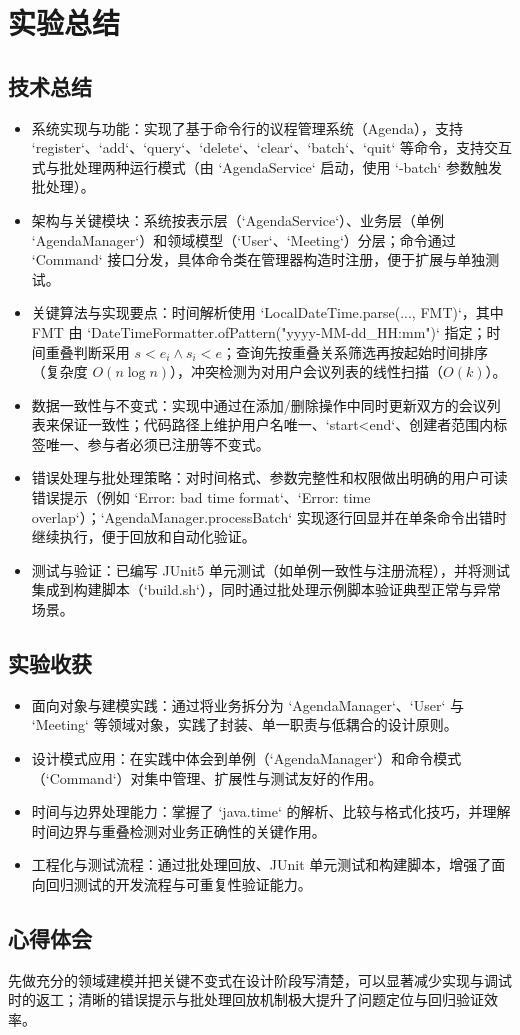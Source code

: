\chapter{实验总结}

\section{技术总结}
\begin{itemize}
  \item 系统实现与功能：实现了基于命令行的议程管理系统（Agenda），支持 `register`、`add`、`query`、`delete`、`clear`、`batch`、`quit` 等命令，支持交互式与批处理两种运行模式（由 `AgendaService` 启动，使用 `-batch` 参数触发批处理）。
  \item 架构与关键模块：系统按表示层（`AgendaService`）、业务层（单例 `AgendaManager`）和领域模型（`User`、`Meeting`）分层；命令通过 `Command` 接口分发，具体命令类在管理器构造时注册，便于扩展与单独测试。
  \item 关键算法与实现要点：时间解析使用 `LocalDateTime.parse(..., FMT)`，其中 FMT 由 `DateTimeFormatter.ofPattern("yyyy-MM-dd\_HH:mm")` 指定；时间重叠判断采用 $s<e_i\land s_i<e$；查询先按重叠关系筛选再按起始时间排序（复杂度 $O(n\log n)$），冲突检测为对用户会议列表的线性扫描（$O(k)$）。
  \item 数据一致性与不变式：实现中通过在添加/删除操作中同时更新双方的会议列表来保证一致性；代码路径上维护用户名唯一、`start<end`、创建者范围内标签唯一、参与者必须已注册等不变式。
  \item 错误处理与批处理策略：对时间格式、参数完整性和权限做出明确的用户可读错误提示（例如 `Error: bad time format`、`Error: time overlap`）；`AgendaManager.processBatch` 实现逐行回显并在单条命令出错时继续执行，便于回放和自动化验证。
  \item 测试与验证：已编写 JUnit5 单元测试（如单例一致性与注册流程），并将测试集成到构建脚本（`build.sh`），同时通过批处理示例脚本验证典型正常与异常场景。
\end{itemize}

\section{实验收获}
\begin{itemize}
  \item 面向对象与建模实践：通过将业务拆分为 `AgendaManager`、`User` 与 `Meeting` 等领域对象，实践了封装、单一职责与低耦合的设计原则。
  \item 设计模式应用：在实践中体会到单例（`AgendaManager`）和命令模式（`Command`）对集中管理、扩展性与测试友好的作用。
  \item 时间与边界处理能力：掌握了 `java.time` 的解析、比较与格式化技巧，并理解时间边界与重叠检测对业务正确性的关键作用。
  \item 工程化与测试流程：通过批处理回放、JUnit 单元测试和构建脚本，增强了面向回归测试的开发流程与可重复性验证能力。
\end{itemize}

\section{心得体会}
先做充分的领域建模并把关键不变式在设计阶段写清楚，可以显著减少实现与调试时的返工；清晰的错误提示与批处理回放机制极大提升了问题定位与回归验证效率。